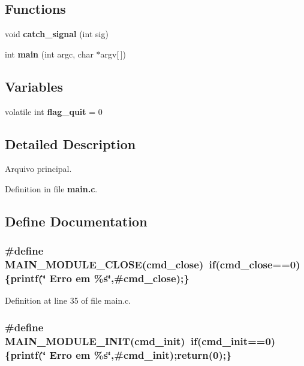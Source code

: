 \subsection*{Functions}
\begin{DoxyCompactItemize}
\item 
void {\bf catch\_\-signal} (int sig)
\item 
int {\bf main} (int argc, char $\ast$argv[$\,$])
\end{DoxyCompactItemize}
\subsection*{Variables}
\begin{DoxyCompactItemize}
\item 
volatile int {\bf flag\_\-quit} = 0
\end{DoxyCompactItemize}


\subsection{Detailed Description}
Arquivo principal. 

Definition in file {\bf main.c}.

\subsection{Define Documentation}
\subsubsection[{MAIN\_\-MODULE\_\-CLOSE}]{\setlength{\rightskip}{0pt plus 5cm}\#define MAIN\_\-MODULE\_\-CLOSE(cmd\_\-close)~if(cmd\_\-close==0)\{printf(\char`\"{}    Erro em \%s\char`\"{},\#cmd\_\-close);\}}\label{main_8c_a157e317f6ab5f5bf967ce3df83848a42}


Definition at line 35 of file main.c.
\subsubsection[{MAIN\_\-MODULE\_\-INIT}]{\setlength{\rightskip}{0pt plus 5cm}\#define MAIN\_\-MODULE\_\-INIT(cmd\_\-init)~if(cmd\_\-init==0)\{printf(\char`\"{}    Erro em \%s\char`\"{},\#cmd\_\-init);return(0);\}}\label{main_8c_ab60ccfd1ea609f7560f164355423015c}


